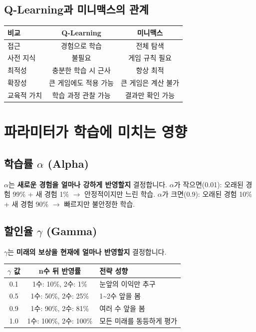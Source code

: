 \documentclass[11pt,a4paper]{article}
\begin{document}
\subsection{Q-Learning과 미니맥스의 관계}

\begin{center}
\renewcommand{\arraystretch}{1.4}
\begin{tabular}{|l|c|c|}
\hline
\rowcolor{tableheader}
\textbf{비교} & \textbf{Q-Learning} & \textbf{미니맥스} \\
\hline
접근 & 경험으로 학습 & 전체 탐색 \\
\hline
사전 지식 & 불필요 & 게임 규칙 필요 \\
\hline
최적성 & 충분한 학습 시 근사 & 항상 최적 \\
\hline
확장성 & 큰 게임에도 적용 가능 & 큰 게임은 계산 불가 \\
\hline
교육적 가치 & 학습 과정 관찰 가능 & 결과만 확인 가능 \\
\hline
\end{tabular}
\end{center}

\section{파라미터가 학습에 미치는 영향}

\subsection{학습률 $\alpha$ (Alpha)}

$\alpha$는 \textbf{새로운 경험을 얼마나 강하게 반영할지} 결정합니다. $\alpha$가 작으면(0.01): 오래된 경험 99\% + 새 경험 1\% $\to$ 안정적이지만 느린 학습. $\alpha$가 크면(0.9): 오래된 경험 10\% + 새 경험 90\% $\to$ 빠르지만 불안정한 학습.

\subsection{할인율 $\gamma$ (Gamma)}

$\gamma$는 \textbf{미래의 보상을 현재에 얼마나 반영할지} 결정합니다.

\begin{center}
\renewcommand{\arraystretch}{1.4}
\begin{tabular}{|c|c|l|}
\hline
\rowcolor{tableheader}
\textbf{$\gamma$ 값} & \textbf{n수 뒤 반영률} & \textbf{전략 성향} \\
\hline
0.1 & 1수: 10\%, 2수: 1\% & 눈앞의 이익만 추구 \\
\hline
0.5 & 1수: 50\%, 2수: 25\% & 1\textasciitilde2수 앞을 봄 \\
\hline
0.9 & 1수: 90\%, 2수: 81\% & 여러 수 앞을 봄 \\
\hline
1.0 & 1수: 100\%, 2수: 100\% & 모든 미래를 동등하게 평가 \\
\hline
\end{tabular}
\end{center}
\end{document}
